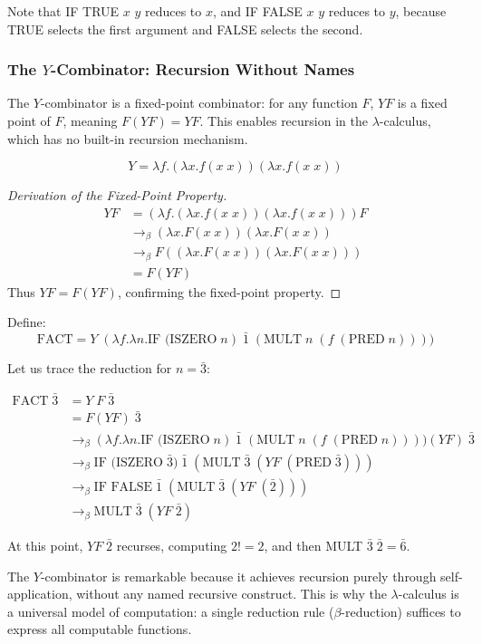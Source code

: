 Note that IF TRUE $x$ $y$ reduces to $x$, and IF FALSE $x$ $y$ reduces to $y$, because TRUE selects the first argument and FALSE selects the second.

\subsubsection*{The $Y$-Combinator: Recursion Without Names}

The $Y$-combinator is a fixed-point combinator: for any function $F$, $Y F$ is a fixed point of $F$, meaning $F(Y F) = Y F$. This enables recursion in the $\lambda$-calculus, which has no built-in recursion mechanism.

\begin{definition}
\[
Y = \lambda f.(\lambda x. f(x\; x))(\lambda x. f(x\; x))
\]
\end{definition}

\begin{proof}[Derivation of the Fixed-Point Property]
\begin{align*}
Y F &= (\lambda f.(\lambda x. f(x\; x))(\lambda x. f(x\; x))) F \\
    &\to_\beta (\lambda x. F(x\; x))(\lambda x. F(x\; x)) \\
    &\to_\beta F((\lambda x. F(x\; x))(\lambda x. F(x\; x))) \\
    &= F(Y F)
\end{align*}
Thus $Y F = F(Y F)$, confirming the fixed-point property.
\end{proof}

\begin{example}
Define:
\[
\text{FACT} = Y\; (\lambda f.\lambda n. \text{IF (ISZERO}\; n)\; \bar{1}\; (\text{MULT}\; n\; (f\; (\text{PRED}\; n))))
\]

Let us trace the reduction for $n = \bar{3}$:

\begin{align*}
\text{FACT}\; \bar{3}
&= Y\; F\; \bar{3} \\
&= F(Y F)\; \bar{3} \\
&\to_\beta (\lambda f.\lambda n. \text{IF (ISZERO}\; n)\; \bar{1}\; (\text{MULT}\; n\; (f\; (\text{PRED}\; n)))) (YF)\; \bar{3} \\
&\to_\beta \text{IF (ISZERO}\; \bar{3})\; \bar{1}\; (\text{MULT}\; \bar{3}\; (YF\; (\text{PRED}\; \bar{3}))) \\
&\to_\beta \text{IF FALSE}\; \bar{1}\; (\text{MULT}\; \bar{3}\; (YF\; (\bar{2}))) \\
&\to_\beta \text{MULT}\; \bar{3}\; (YF\; \bar{2})
\end{align*}

At this point, $YF\; \bar{2}$ recurses, computing $2! = 2$, and then MULT $\bar{3}\; \bar{2} = \bar{6}$.

The $Y$-combinator is remarkable because it achieves recursion purely through self-application, without any named recursive construct. This is why the $\lambda$-calculus is a universal model of computation: a single reduction rule ($\beta$-reduction) suffices to express all computable functions.
\end{example}

